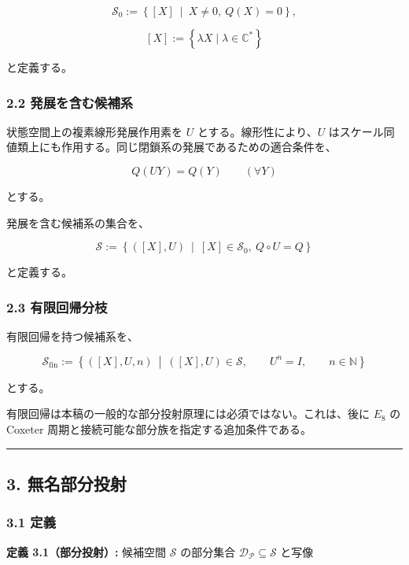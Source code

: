 \documentclass[
  a4paper,
  ja=minimal,
  xelatex,
  paragraph-mark={},
]{bxjsarticle}
\begin{document}
\[
\mathscr S_0
:=
\left\{
[X]
\ \middle|\
X\neq0,\ Q(X)=0
\right\},
\]

\[
[X]
:=
\left\{
\lambda X
\mid
\lambda\in\mathbb C^\ast
\right\}
\]

と定義する。

\subsubsection{2.2
発展を含む候補系}\label{ux767aux5c55ux3092ux542bux3080ux5019ux88dcux7cfb}

状態空間上の複素線形発展作用素を \(U\) とする。線形性により、\(U\)
はスケール同値類上にも作用する。同じ閉鎖系の発展であるための適合条件を、

\[
Q(UY)=Q(Y)
\qquad
(\forall Y)
\]

とする。

発展を含む候補系の集合を、

\[
\mathscr S
:=
\left\{
([X],U)
\ \middle|\
[X]\in\mathscr S_0,\ Q\circ U=Q
\right\}
\]

と定義する。

\subsubsection{2.3
有限回帰分枝}\label{ux6709ux9650ux56deux5e30ux5206ux679d}

有限回帰を持つ候補系を、

\[
\mathscr S_{\mathrm{fin}}
:=
\left\{
([X],U,n)
\ \middle|\
([X],U)\in\mathscr S,
\qquad
U^n=I,
\qquad
n\in\mathbb N
\right\}
\]

とする。

有限回帰は本稿の一般的な部分投射原理には必須ではない。これは、後に
\(E_8\) の Coxeter 周期と接続可能な部分族を指定する追加条件である。

\begin{center}\rule{0.5\linewidth}{0.5pt}\end{center}

\subsection{3. 無名部分投射}\label{ux7121ux540dux90e8ux5206ux6295ux5c04}

\subsubsection{3.1 定義}\label{ux5b9aux7fa9}

\textbf{定義 3.1（部分投射）:} 候補空間 \(\mathscr S\) の部分集合
\(\mathscr D_{\mathcal P}\subseteq\mathscr S\) と写像
\end{document}
